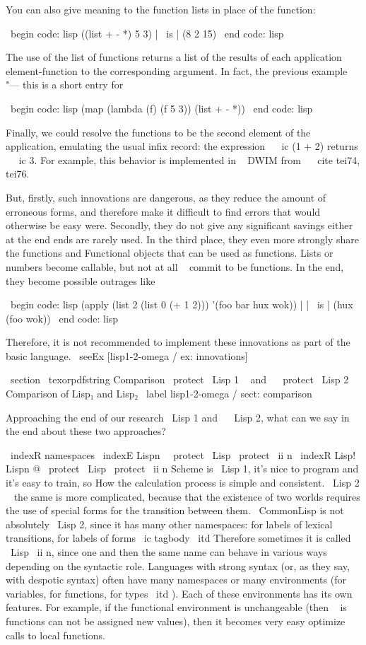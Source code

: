 You can also give meaning to the function lists in place of the function:

\ begin {code: lisp}
((list + - *) 5 3) | \ is | (8 2 15)
\ end {code: lisp}

The use of the list of functions returns a list of the results of each application
element-function to the corresponding argument. In fact, the previous example
"--- this is a short entry for

\ begin {code: lisp}
(map (lambda (f) (f 5 3))
     (list + - *))
\ end {code: lisp}

Finally, we could resolve the functions to be the second element of the application,
emulating the usual infix record: the expression ~ \ ic {(1 + 2)} returns ~ \ ic {3}.
For example, this behavior is implemented in ~ DWIM from ~ \ cite {tei74, tei76}.

But, firstly, such innovations are dangerous, as they reduce the amount of
erroneous forms, and therefore make it difficult to find errors that would otherwise be easy
were. Secondly, they do not give any significant savings either at the end
ends are rarely used. In the third place, they even more strongly share the functions and
Functional objects that can be used as functions. Lists or numbers
become callable, but not at all ~ commit to be functions. In the end, they become
possible outrages like

\ begin {code: lisp}
(apply (list 2 (list 0 (+ 1 2)))
       '(foo bar hux wok))
   | | \ is | (hux (foo wok))
\ end {code: lisp}

Therefore, it is not recommended to implement these innovations as part of the basic
language. \ seeEx [lisp1-2-omega / ex: innovations]


\ section { \ texorpdfstring {Comparison \ protect \ Lisp 1 ~ and ~ \ protect \ Lisp 2} %
{Comparison of Lisp₁ and Lisp₂}} %
\ label {lisp1-2-omega / sect: comparison}

Approaching the end of our research \ Lisp 1 and ~ \ Lisp 2, what can we say
in the end about these two approaches?

\ indexR {namespaces}
\ indexE {Lispn \ \ protect \ Lisp { \ protect \ ii {n}}}
\ indexR {Lisp! Lispn @ \ protect \ Lisp { \ protect \ ii {n}}}
Scheme is \ Lisp 1, it's nice to program and it's easy to train, so
How the calculation process is simple and consistent. \ Lisp 2 ~ the same is more complicated, because
that the existence of two worlds requires the use of special forms for the transition
between them. { \ CommonLisp } is not ~ absolutely \ Lisp 2, since it has many
other namespaces: for labels of lexical transitions, for labels of forms
\ ic {tagbody} { \ itd } Therefore sometimes it is called ~ \ Lisp { \ ii {n}}, since one and
then the same name can behave in various ways depending on the syntactic
role. Languages ​​with strong syntax (or, as they say, with despotic syntax)
often have many namespaces or many environments (for variables,
for functions, for types { \ itd }). Each of these environments has its own
features. For example, if the functional environment is unchangeable (then ~ is
functions can not be assigned new values), then it becomes very easy
optimize calls to local functions.

